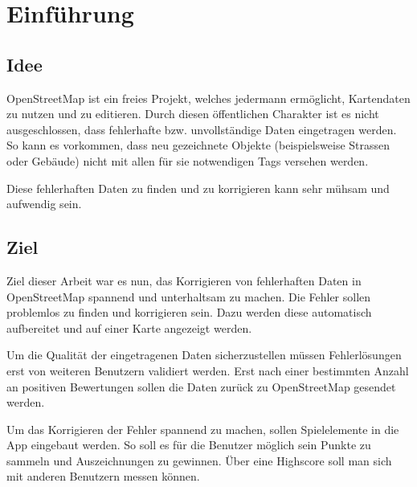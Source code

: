 \section{Einführung}

\subsection{Idee}
\gls{OpenStreetMap} ist ein freies Projekt, welches jedermann ermöglicht, Kartendaten zu nutzen und zu editieren.
Durch diesen öffentlichen Charakter ist es nicht ausgeschlossen, dass fehlerhafte bzw. unvollständige Daten eingetragen werden.
So kann es vorkommen, dass neu gezeichnete Objekte (beispielsweise Strassen oder Gebäude) nicht mit allen für sie notwendigen \glspl{Tag} versehen werden.

Diese fehlerhaften Daten zu finden und zu korrigieren kann sehr mühsam und aufwendig sein.

\subsection{Ziel}
Ziel dieser Arbeit war es nun, das Korrigieren von fehlerhaften Daten in \gls{OpenStreetMap} spannend und unterhaltsam zu machen.
Die Fehler sollen problemlos zu finden und korrigieren sein.
Dazu werden diese automatisch aufbereitet und auf einer Karte angezeigt werden.

Um die Qualität der eingetragenen Daten sicherzustellen müssen Fehlerlösungen erst von weiteren Benutzern validiert werden.
Erst nach einer bestimmten Anzahl an positiven Bewertungen sollen die Daten zurück zu \gls{OpenStreetMap} gesendet werden.

Um das Korrigieren der Fehler spannend zu machen, sollen Spielelemente in die App eingebaut werden.
So soll es für die Benutzer möglich sein Punkte zu sammeln und Auszeichnungen zu gewinnen. Über eine Highscore soll man sich mit anderen Benutzern messen können.